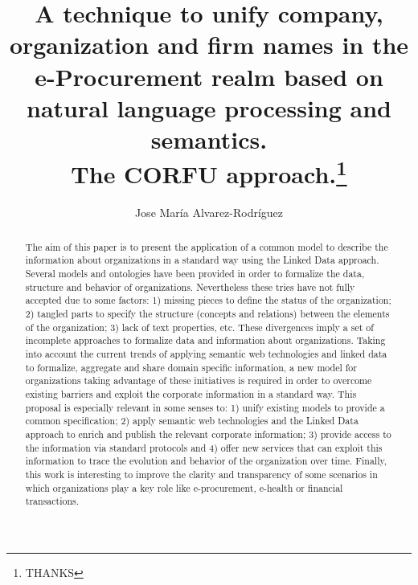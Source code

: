 \documentclass{llncs}
\begin{document}
\title{A technique to unify company, organization and firm names in the e-Procurement realm based on natural language processing and semantics. \\ The CORFU approach.\thanks{THANKS}}

\titlerunning{}

\author{Jose Mar\'{i}a Alvarez-Rodr\'{i}guez} 







\date{}

\maketitle

\renewcommand{\labelitemi}{$\bullet$}

\begin{abstract}
The aim of this paper is to present the application of a common model to describe the information about organizations in a standard way 
using the Linked Data approach. Several models and ontologies have been provided in order 
to formalize the data, structure and behavior of organizations. Nevertheless these tries have not 
fully accepted due to some factors: 1) missing pieces to define the status of the organization; 
2) tangled parts to specify the structure (concepts and relations) between the elements of the organization; 
3) lack of text properties, etc. These divergences imply a set of incomplete approaches to formalize 
data and information about organizations. Taking into account the current trends of applying 
semantic web technologies and linked data to formalize, aggregate and share domain specific information, 
a new model for organizations taking advantage of these initiatives is required in order to overcome existing barriers 
and exploit the corporate information in a standard way. This proposal is especially relevant in 
some senses to: 1) unify existing models to provide a common specification; 2) apply semantic web technologies and 
the Linked Data approach to enrich and publish the relevant corporate information; 3) 
provide access to the information via standard protocols and 4) offer new services that can exploit this 
information to trace the evolution and behavior of the organization over time. Finally, 
this work is interesting to improve the clarity and transparency of some scenarios in which 
organizations play a key role like e-procurement, e-health or financial transactions.
\end{abstract}
\end{document}
